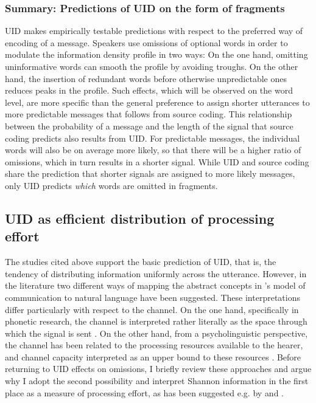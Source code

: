 \subsubsection{Summary: Predictions of UID on the form of fragments}
UID makes empirically testable predictions with respect to the preferred way of encoding of a message. Speakers use omissions of optional words in order to modulate the information density profile in two ways: On the one hand, omitting uninformative words can smooth the profile by avoiding troughs. On the other hand, the insertion of redundant words before otherwise unpredictable ones reduces peaks in the profile. Such effects, which will be observed on the word level, are more specific than the general preference to assign shorter utterances to more predictable messages that follows from source coding. This relationship between the probability of a message and the length of the signal that source coding predicts also results from UID. For predictable messages, the individual words will also be on average more likely, so that there will be a higher ratio of omissions, which in turn results in a shorter signal. While UID and source coding share the prediction that shorter signals are assigned to more likely messages, only UID predicts \textit{which} words are omitted in fragments.

\subsection{UID as efficient distribution of processing effort} 
\label{sec:infotheory-effort}
The studies cited above support the basic prediction of UID, that is, the tendency of distributing information uniformly across the utterance. However, in the literature two different ways of mapping the abstract concepts in \citeauthor{shannon1948}'s model of communication to natural language have been suggested. These interpretations differ particularly with respect to the channel. On the one hand, specifically in phonetic research, the channel is interpreted rather literally as the space through which the signal is sent \citep[see e.g.][]{aylett.turk2004}. On the other hand, from a psycholinguistic perspective, the channel has been related to the processing resources available to the hearer, and channel capacity interpreted as an upper bound to these resources \citep[see e.g.][]{fenk.fenk1980}. Before returning to UID effects on omissions, I briefly review these approaches and argue why I adopt the second possibility and interpret Shannon information in the first place as a measure of processing effort, as has been suggested e.g. by \citet{hale2001} and \citet{levy2008}. 

